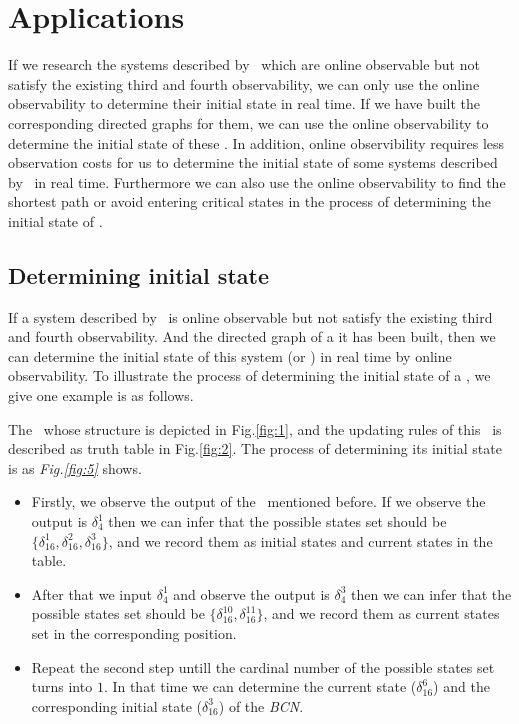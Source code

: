 \section{Applications}
\label{sec:app}
If we research the systems described by \BCNs\ which are online observable but not satisfy the existing third and fourth observability, we can only use the online observability to determine their initial state in real time. If we have built the corresponding directed graphs for them, we can use the online observability to determine the initial state of these \BCNs. In addition, online observibility requires less observation costs for us to determine the initial state of some systems described by  \BCNs\ in real time. Furthermore we can also use the online observability to find the shortest path or avoid entering critical states in the process of determining the initial state of \BCNs. %

\subsection{Determining initial state}

If a system described by \BCN\ is online observable but not satisfy the existing third and fourth observability. And the directed graph of a it has been built, then we can determine the initial state of this system (or \BCN) in real time by online observability. To illustrate the process of determining the initial state of a \BCN, we give one example is as follows.
\begin{example}
The \BCN\ whose structure is depicted in Fig.\ref{fig:1}, and the updating rules of this \BCN\ is described as truth table in Fig.\ref{fig:2}. The process of determining its initial state is as {\em Fig.\ref{fig:5}} shows. 
\begin{itemize}
  \item Firstly, we observe the output of the \BCN\ mentioned before. If we observe the output is $\delta_4^1$ then we can infer that the possible states set should be $\{\delta_{16}^1,\delta_{16}^2,\delta_{16}^3\}$, and we record them as initial states and current states in the table. 
  \item After that we input  $\delta_4^1$ and observe the output is $\delta_4^3$ then we can infer that the possible states set should be $\{\delta_{16}^{10},\delta_{16}^{11}\}$, and we record them as current states set in the corresponding position. 
 \item Repeat the second step untill the cardinal number of the possible states set turns into $1$. In that time we can determine the current state ($\delta_{16}^{6}$) and the corresponding initial state  ($\delta_{16}^{3}$) of the {\em BCN}.
\end{itemize} 
\end{example}   


